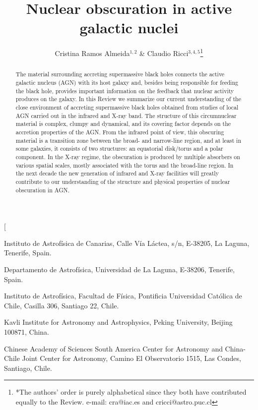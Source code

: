 \documentclass{natureprintstyle}
\title{Nuclear obscuration in active galactic nuclei}
\author{Cristina Ramos Almeida$^{1,2}$ \& Claudio Ricci$^{3,4,5}$\thanks{*The authors' order is purely alphabetical since they both have contributed equally to the Review. 
e-mail: cra@iac.es and cricci@astro.puc.cl}}
\begin{document}
\pagestyle{plain}

\twocolumn[
  \begin{@twocolumnfalse}

\let\newpage\relax\maketitle


\begin{affiliations}
 \item Instituto de Astrof\' isica de Canarias, Calle V\' ia L\'actea, s/n, E-38205, La Laguna, Tenerife, Spain.
 \item Departamento de Astrof\' isica, Universidad de La Laguna, E-38206, Tenerife, Spain.
 \item Instituto de Astrof\' isica, Facultad de F\' isica, Pontificia Universidad Cat\'olica de Chile, Casilla 306, Santiago 22, Chile.
 \item Kavli Institute for Astronomy and Astrophysics, Peking University, Beijing 100871, China.
 \item Chinese Academy of Sciences South America Center for Astronomy and China-Chile Joint Center for Astronomy, Camino El Observatorio 1515, Las Condes, Santiago, Chile.
\end{affiliations}

%     

\bigskip




    \begin{abstract}
        The material surrounding accreting supermassive black holes connects the active galactic nucleus (AGN) with its host galaxy and, besides being responsible for feeding the black hole, 
       provides important information on the feedback that nuclear activity produces on the galaxy. In this Review we summarize our current understanding of the close environment of accreting 
       supermassive black holes obtained from studies of local AGN carried out in the infrared and X-ray band. The structure of this circumnuclear material is complex, clumpy and dynamical, 
       and its covering factor depends on the accretion properties of the AGN. From the infrared point of view, this obscuring material is a transition zone between the broad- and 
       narrow-line region, and at least in some galaxies, it consists of two structures: an equatorial disk/torus and a polar component. In the X-ray regime, the obscuration is produced 
       by multiple absorbers on various spatial scales, mostly associated with the torus and the broad-line region. In the next decade the new generation of infrared and X-ray facilities will 
       greatly contribute to our understanding of the structure and physical properties of nuclear obscuration in AGN.
      \bigskip
    \end{abstract}
  \end{@twocolumnfalse}
\end{document}

